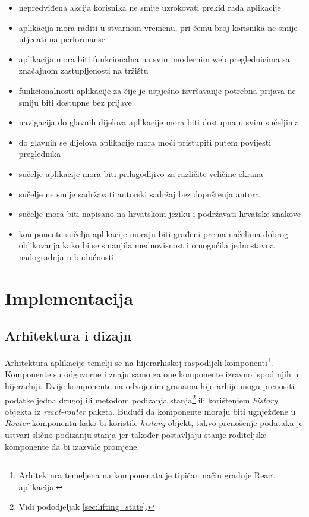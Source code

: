 \documentclass[times, utf8, zavrsni, numeric]{fer}
\newcommand{\razmaks}{\vspace{10pt}}
\begin{document}
\razmaks
\begin{itemize}
  \item nepredviđena akcija korisnika ne smije uzrokovati prekid rada aplikacije
  \item aplikacija mora raditi u stvarnom vremenu, pri čemu broj korisnika ne smije utjecati na performanse
  \item aplikacija mora biti funkcionalna na svim modernim web preglednicima sa značajnom zastupljenosti na tržištu
  \item funkcionalnosti aplikacije za čije je uspješno izvršavanje potrebna prijava ne smiju biti dostupne bez prijave
  \item navigacija do glavnih dijelova aplikacije mora biti dostupna u svim sučeljima
  \item do glavnih se dijelova aplikacije mora moći pristupiti putem povijesti preglednika
  \item sučelje aplikacije mora biti prilagodljivo za različite veličine ekrana
  \item sučelje ne smije sadržavati autorski sadržaj bez dopuštenja autora
  \item sučelje mora biti napisano na hrvatskom jeziku i podržavati hrvatske znakove
  \item komponente sučelja aplikacije moraju biti građeni prema načelima dobrog oblikovanja kako bi se smanjila međuovisnost i omogućila jednostavna nadogradnja u budućnosti
\end{itemize}


\chapter{Implementacija}


\section{Arhitektura i dizajn}

Arhitektura aplikacije temelji se na hijerarhiskoj raspodijeli komponenti\footnote{Arhitektura temeljena na komponenata  je tipičan način gradnje React aplikacija\citep{understandingCBA}.}.
Komponente su odgovorne i znaju samo za one komponente izravno ispod njih u hijerarhiji.
Dvije komponente na odvojenim granama hijerarhije mogu prenositi podatke jedna drugoj ili metodom podizanja stanja\footnote{Vidi pododjeljak \ref{sec:lifting_state}.} ili korištenjem \emph{history} objekta iz \emph{react-router} paketa.
Budući da komponente moraju biti ugnježđene u \emph{Router} komponentu kako bi koristile \emph{history} objekt, takvo prenošenje podataka je ustvari slično podizanju stanja jer također postavljaju stanje roditeljske komponente da bi izazvale promjene. 
\end{document}
